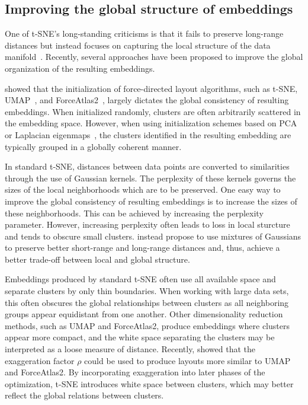 \documentclass[article]{jss}
\begin{document}
\subsection{Improving the global structure of embeddings} \label{sec:meth.global}

One of t-SNE's long-standing criticisms is that it fails to preserve long-range
distances but instead focuses on capturing the local structure of the data
manifold~\citep{becht2019dimensionality}. Recently, several approaches have been
proposed to improve the global organization of the resulting embeddings.

\citet{kobak2019umap} showed that the initialization of force-directed layout
algorithms, such as t-SNE, UMAP~\citep{2018arXivUMAP}, and
ForceAtlas2~\citep{jacomy2014forceatlas2}, largely dictates the global
consistency of resulting embeddings. When initialized randomly, clusters are
often arbitrarily scattered in the embedding space. However, when using
initialization schemes based on PCA or Laplacian eigenmaps~\citep{belkin2001laplacian}, the clusters identified in the resulting embedding are typically grouped in a globally
coherent manner.

In standard t-SNE, distances between data points are converted to similarities
through the use of Gaussian kernels. The perplexity of these kernels governs the
sizes of the local neighborhoods which are to be preserved. One easy way to
improve the global consistency of resulting embeddings is to increase the sizes
of these neighborhoods. This can be achieved by increasing the perplexity
parameter. However, increasing perplexity often leads to loss in local sturcture
and tends to obscure small clusters. \citet{kobak2019art} instead propose to use
mixtures of Gaussians to preserve better short-range and long-range distances
and, thus, achieve a better trade-off between local and global structure.

Embeddings produced by standard t-SNE often use all available space and separate
clusters by only thin boundaries. When working with large data sets, this often
obscures the global relationships between clusters as all neighboring groups
appear equidistant from one another.  Other dimensionality reduction methods,
such as UMAP and ForceAtlas2, produce embeddings where clusters appear more
compact, and the white space separating the clusters may be interpreted as a
loose measure of distance. Recently, \citet{bohm2020unifying} showed that the
exaggeration factor $\rho$ could be used to produce layouts more similar to UMAP
and ForceAtlas2. By incorporating exaggeration into later phases of the
optimization, t-SNE introduces white space between clusters, which may better
reflect the global relations between clusters.
\end{document}
